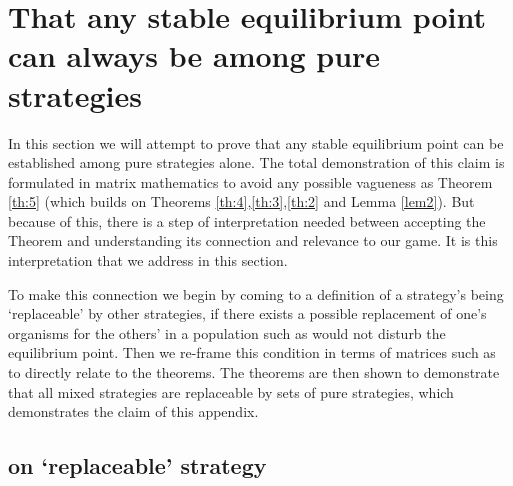 \section{That any stable equilibrium point can always be among pure strategies}\label{appendix5}
In this section we will attempt to prove that any stable equilibrium point can be established among pure strategies alone. The total demonstration of this claim is formulated in matrix mathematics to avoid any possible vagueness as Theorem \ref{th:5} (which builds on Theorems \ref{th:4},\ref{th:3},\ref{th:2} and Lemma \ref{lem2}).
But because of this, there is a step of interpretation needed between accepting the Theorem and understanding its connection and relevance to our game. It is this interpretation that we address in this section.

To make this connection we begin by coming to a definition of a strategy's being `replaceable' by other strategies, if there exists a possible replacement of one's organisms for the others' in a population such as would not disturb the equilibrium point. Then we re-frame this condition in terms of matrices such as to directly relate to the theorems. The theorems are then shown to demonstrate that all mixed strategies are replaceable by sets of pure strategies, which demonstrates the claim of this appendix.

\subsection{on `replaceable' strategy}


